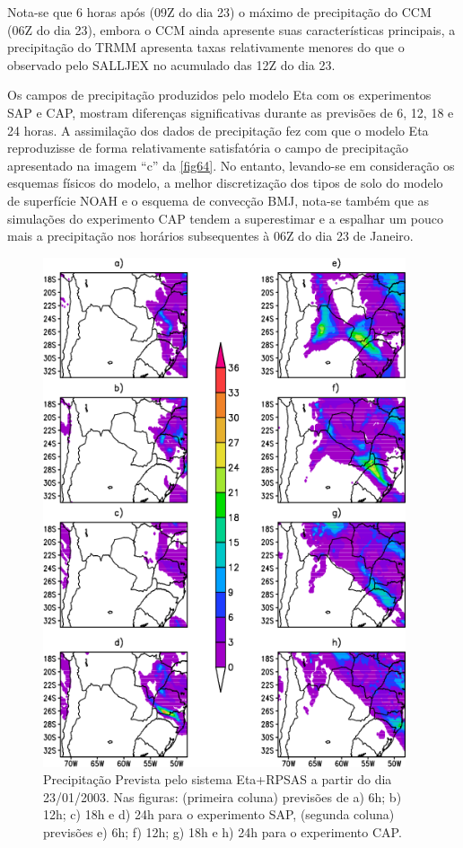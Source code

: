 Nota-se que 6 horas após (09Z do dia 23) o máximo de precipitação do CCM (06Z do dia 23), embora o CCM ainda apresente suas características principais, a precipitação do TRMM apresenta taxas relativamente menores do que o observado pelo SALLJEX no acumulado das 12Z do dia 23. 

Os campos de precipitação produzidos pelo modelo Eta com os experimentos SAP e CAP, mostram diferenças significativas durante as previsões de 6, 12, 18 e 24 horas. A assimilação dos dados de precipitação fez com que o modelo Eta reproduzisse de forma relativamente satisfatória o campo de precipitação apresentado na imagem ``c'' da \autoref{fig64}. No entanto, levando-se em consideração os esquemas físicos do modelo,  a melhor discretização dos tipos de solo do modelo de superfície NOAH e o esquema de convecção BMJ, nota-se também que as simulações do experimento CAP tendem a superestimar e a espalhar um pouco mais a precipitação nos horários subsequentes à 06Z do dia 23 de Janeiro.

\begin{figure}[!hpb]
\centering
\includegraphics[height=15cm]{./figs/prec_eta1.png}
\caption{Precipitação Prevista pelo sistema Eta+RPSAS a partir do dia 23/01/2003. Nas figuras: (primeira coluna) previsões de a) 6h; b) 12h; c) 18h e d) 24h para o experimento SAP, (segunda coluna) previsões e) 6h; f) 12h; g) 18h e h) 24h para o experimento CAP.}
\label{fig64}
\end{figure}

